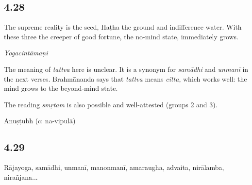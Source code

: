 \begin{ekdosis}



\subsection*{4.28}
\begin{translation}[hp04_028]
The supreme reality is the seed, Haṭha the ground and indifference water. With these three the creeper of good fortune, the no-mind state, immediately grows.
\end{translation}


\begin{testimonia}[hp04_028]
\emph{Yogacintāmaṇi}
\begin{versinnote}
\end{versinnote}
\end{testimonia}

\begin{philcomm}[hp04_028]
The meaning of \emph{tattva} here is unclear. It is a synonym for \emph{samādhi} and \emph{unmanī} in the next verses. Brahmānanda says that \emph{tattva} means \emph{citta}, which works well: the mind grows to the beyond-mind state.


The reading \emph{smṛtam} is also possible and well-attested (groups 2 and 3).%

\end{philcomm}

\begin{metre}[hp04_028]
Anuṣṭubh (c: na-vipulā)
\end{metre}

\subsection*{4.29}
\begin{translation}[hp04_029]
Rājayoga, samādhi, unmanī, manonmanī, amaraugha, advaita, nirālamba, nirañjana...%
\end{translation}


\end{ekdosis}
